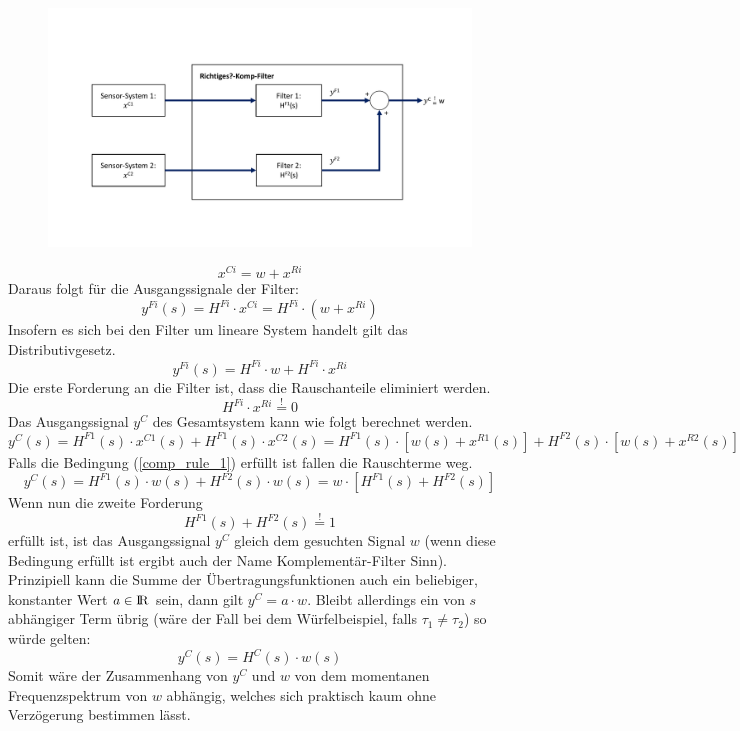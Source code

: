 \documentclass{article}
\begin{document}
\begin{figure}[!h]
\includegraphics[scale=0.5,trim={0 3cm 0 4cm},clip]{Allg_Komp}
\end{figure}

\begin{equation}
x^{Ci} = w + x^{Ri} 
\end{equation}
Daraus folgt für die Ausgangssignale der Filter:
\begin{equation}
y^{Fi}(s) = H^{Fi} \cdot x^{Ci} = H^{Fi} \cdot (w + x^{Ri}) 
\end{equation}
Insofern es sich bei den Filter um lineare System handelt gilt das Distributivgesetz.
\begin{equation}
y^{Fi}(s) = H^{Fi} \cdot w + H^{Fi} \cdot x^{Ri} 
\end{equation}
Die erste Forderung an die Filter ist, dass die Rauschanteile eliminiert werden.
\begin{equation}
\label{comp_rule_1}
H^{Fi} \cdot x^{Ri} \overset{!}{=} 0
\end{equation}
Das Ausgangssignal $y^C$ des Gesamtsystem kann wie folgt berechnet werden.
\begin{equation}
y^C(s) = H^{F1}(s) \cdot x^{C1}(s) + H^{F1}(s) \cdot x^{C2}(s) = H^{F1}(s) \cdot [w(s) + x^{R1}(s)] + H^{F2}(s) \cdot [w(s) + x^{R2}(s)]
\end{equation}
Falls die Bedingung (\ref{comp_rule_1}) erfüllt ist fallen die Rauschterme weg.
\begin{equation}
y^C(s) = H^{F1}(s) \cdot w(s) + H^{F2}(s) \cdot w(s) = w \cdot [H^{F1}(s) + H^{F2}(s)]
\end{equation}
Wenn nun die zweite Forderung 
\begin{equation}
\label{comp_rule_2}
H^{F1}(s) + H^{F2}(s) \overset{!}{=} 1
\end{equation}
erfüllt ist, ist das Ausgangssignal $y^C$ gleich dem gesuchten Signal $w$ (wenn diese Bedingung erfüllt ist ergibt auch der Name Komplementär-Filter Sinn). Prinzipiell kann die Summe der Übertragungsfunktionen auch ein beliebiger, konstanter Wert $a \in \rm I\!R$ sein, dann gilt $y^C = a \cdot w$. Bleibt allerdings ein von $s$ abhängiger Term übrig (wäre der Fall bei dem Würfelbeispiel, falls $\tau_1 \neq \tau_2$) so würde gelten:
\begin{equation}
y^C(s) = H^C(s) \cdot w(s)
\end{equation}
Somit wäre der Zusammenhang von $y^C$ und $w$ von dem momentanen Frequenzspektrum von $w$ abhängig, welches sich praktisch kaum ohne Verzögerung bestimmen lässt.
\end{document}
